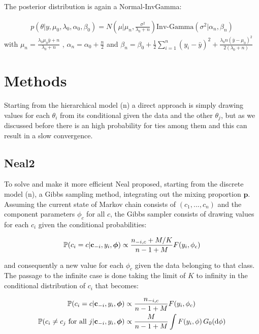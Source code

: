 The posterior distribution is again a Normal-InvGamma:

\begin{align}
          p(\theta|y,\mu_0,\lambda_0, \alpha_0, \beta_0)=N\left(\mu | \mu_n ,\frac{\sigma^2} {\lambda_0 + n}\right)\text{Inv-Gamma}(\sigma^2|\alpha_n, \beta_n )
\end{align}
with $\mu_n=\frac{\lambda_0 \mu_0 \bar{y} + n}{\lambda_0 + n}$ , $\alpha_n= \alpha_0 + \frac{n}{2} $ and $\beta_n= \beta_0 + \frac{1}{2}\sum_{i=1}^{n} (y_i-\bar{y})^2 + \frac{\lambda_0 n(\bar{y}-\mu_0)^2}{2(\lambda_0 + n)}$

\section{Methods}
 
Starting from the hierarchical model (n) a direct approach is simply drawing values for each $\theta_i$ from its conditional given the data and the other $\theta_j$, but as we discussed before there is an high probability for ties among them and this can result in a slow convergence. 

\subsection{Neal2}

To solve and make it more efficient Neal proposed, starting from the discrete model (n), a Gibbs sampling method, integrating out the mixing proportion $\textbf{p}$. Assuming the current state of Markov chain consists of $(c_1,...,c_n)$  and the component parameters $\phi_c$ for all $c$, the Gibbs sampler consists of drawing values for each $c_i$ given the conditional probabilities:


\begin{align*}
			\mathbb P(c_{i}=c | \mathbf c_{-i}, y_{i},\boldsymbol\phi) \propto \frac{n_{-i,c} + M/{K}}{n-1+M} F(y_{i},\phi_{c}) 
\end{align*}

and consequently a new value for each $\phi_c$ given the data belonging to that class. The passage to the infinite case is done taking the limit of $K$ to infinity in the conditional distribution of $c_i$ that becomes:


\begin{align*}
			\mathbb P(c_{i}=c | \mathbf c_{-i}, y_{i},\boldsymbol\phi) &\propto \frac{n_{-i,c} }{n-1+M} F(y_{i},\phi_{c}) \\
			\mathbb P(c_{i}\neq c_{j} \text{ for all } j | \mathbf c_{-i}, y_{i},\boldsymbol\phi) &\propto \frac{M }{n-1+M} \int F(y_{i},\phi) \, G_0(\mathrm d\phi)
\end{align*}

